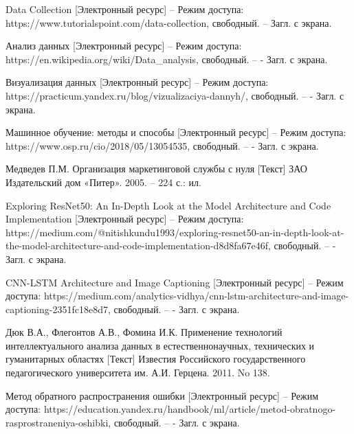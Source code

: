 \newpage


\begin{references}
	\item\label{ref:data-collection} Data Collection [Электронный ресурс] – Режим доступа: https://www.tutorialspoint.com/data-collection, свободный. –
	Загл. с экрана.

	\item\label{ref:data-analysis} Анализ данных [Электронный ресурс] – Режим доступа: https://en.wikipedia.org/wiki/Data\_analysis, свободный. – - Загл. с экрана.

	\item\label{ref:data-visualization} Визуализация данных [Электронный ресурс] – Режим доступа: https://practicum.yandex.ru/blog/vizualizaciya-dannyh/, свободный. – - Загл. с экрана.

	\item\label{ref:machine-learning} Машинное обучение: методы и способы [Электронный ресурс] – Режим доступа: https://www.osp.ru/cio/2018/05/13054535, свободный. – - Загл. с экрана.

	\item\label{ref:marketing} Медведев П.М. Организация маркетинговой службы с нуля [Текст] ЗАО Издательский дом «Питер». 2005. – 224 с.: ил.

	\item\label{ref:res-net} Exploring ResNet50: An In-Depth Look at the Model Architecture and Code Implementation [Электронный ресурс] – Режим доступа: https://medium.com/@nitishkundu1993/exploring-resnet50-an-in-depth-look-at-the-model-architecture-and-code-implementation-d8d8fa67e46f, свободный. – - Загл. с экрана.

	\item\label{ref:cnn-lstm} CNN-LSTM Architecture and Image Captioning [Электронный ресурс] – Режим доступа: https://medium.com/analytics-vidhya/cnn-lstm-architecture-and-image-captioning-2351fc18e8d7, свободный. – - Загл. с экрана.
	
	\item\label{ref:neuron} Дюк В.А., Флегонтов А.В., Фомина И.К. Применение технологий интеллектуального анализа данных в естественнонаучных, технических и гуманитарных областях [Текст] Известия Российского государственного педагогического университета им. А.И. Герцена. 2011. No 138.

	\item\label{ref:back-error} Метод обратного распространения ошибки [Электронный ресурс] – Режим доступа: https://education.yandex.ru/handbook/ml/article/metod-obratnogo-rasprostraneniya-oshibki, свободный. – - Загл. с экрана.


\end{references}
